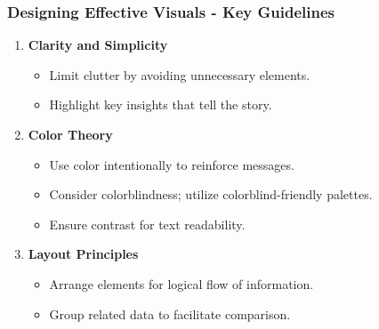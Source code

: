 \documentclass{beamer}
\begin{document}
\begin{frame}[fragile]
    \frametitle{Designing Effective Visuals - Key Guidelines}
    \begin{enumerate}
        \item \textbf{Clarity and Simplicity}
        \begin{itemize}
            \item Limit clutter by avoiding unnecessary elements.
            \item Highlight key insights that tell the story.
        \end{itemize}
        
        \item \textbf{Color Theory}
        \begin{itemize}
            \item Use color intentionally to reinforce messages.
            \item Consider colorblindness; utilize colorblind-friendly palettes.
            \item Ensure contrast for text readability.
        \end{itemize}
        
        \item \textbf{Layout Principles}
        \begin{itemize}
            \item Arrange elements for logical flow of information.
            \item Group related data to facilitate comparison.
        \end{itemize}
    \end{enumerate}
\end{frame}
\end{document}

